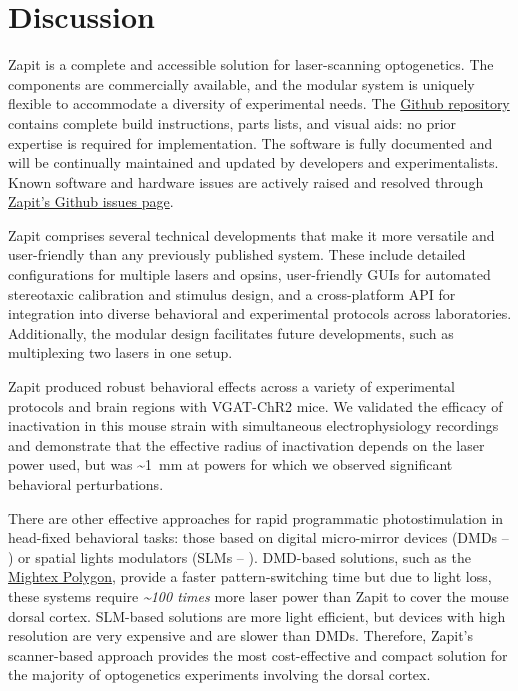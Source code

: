 \section{Discussion}

Zapit is a complete and accessible solution for laser-scanning optogenetics.
The components are commercially available, and the modular system is uniquely flexible to accommodate a diversity of experimental needs.
The \href{https://github.com/Zapit-Optostim/zapit}{Github repository} contains complete build instructions, parts lists, and visual aids: no prior expertise is required for implementation.
The software is fully documented and will be continually maintained and updated by developers and experimentalists.
Known software and hardware issues are actively raised and resolved through \href{https://github.com/Zapit-Optostim/zapit/issues}{Zapit's Github issues page}. 

Zapit comprises several technical developments that make it more versatile and user-friendly than any previously published system.
These include detailed configurations for multiple lasers and opsins, user-friendly GUIs for automated stereotaxic calibration and stimulus design, and a cross-platform API for integration into diverse behavioral and experimental protocols across laboratories.
Additionally, the modular design facilitates future developments, such as multiplexing two lasers in one setup.

Zapit produced robust behavioral effects across a variety of experimental protocols and brain regions with VGAT-ChR2 mice.
We validated the efficacy of inactivation in this mouse strain with simultaneous electrophysiology recordings and demonstrate that the effective radius of inactivation depends on the laser power used, but was \textasciitilde{}1~mm at powers for which we observed significant behavioral perturbations. 

There are other effective approaches for rapid programmatic photostimulation in head-fixed behavioral tasks: those based on digital micro-mirror devices (DMDs -- \cite{Chong2020ManipulatingPerception}) or spatial lights modulators (SLMs --  \cite{Russell2022All-opticalMice, Gauld2024APerception}).
DMD-based solutions, such as the \href{https://www.mightexbio.com/polygon/}{Mightex Polygon}, provide a faster pattern-switching time but due to light loss, these systems require \textit{\textasciitilde{}100 times} more laser power than Zapit to cover the mouse dorsal cortex.
SLM-based solutions are more light efficient, but devices with high resolution are very expensive and are slower than DMDs.
Therefore, Zapit's scanner-based approach provides the most cost-effective and compact solution for the majority of optogenetics experiments involving the dorsal cortex. 


